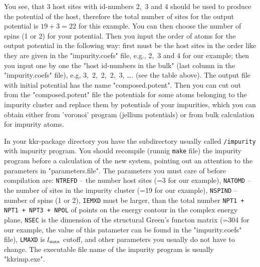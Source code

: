 You see, that 3 host sites with id-numbers 2,\ 3 and 4 should be used
to produce the potential of the host, therefore the total number
of sites for the output potential is $19+3 = 22$ for this example.
You can then choose the number of spins (1 or 2) for your potential.
Then you input the order of atoms for the output potential 
in the following way: first must be the host sites in the order like 
they are given in the "impurity.coefs" file, e.g., 2,\ 3 and 4 for our 
example; then you input one by one the "host id-numbers in the bulk" (last 
column in the "impurity.coefs" file), e.g, 3,\ 2,\  2,\ 2,\ 3, \dots.  
(see the table above). The output file with initial potential has the name
"composed.potent". Then you can cut out from the "composed.potent" file
the potentials for some atoms belonging to the impurity cluster
and replace them by potentials of your impurities, which you can 
obtain either from 'voronoi' program (jellium potentials) or from
bulk calculation for impurity atoms.

 In your kkr-package directory you have the subdirectory usually called
{\tt /impurity} with impurity program. You should recompile (runnig {\tt make} 
file) the impurity program before a calculation of the new system, 
pointing out an attention to the parameters in "parameters.file".
The parameters you must care of before compilation are: {\tt NTREFD} -- 
the number host sites (=3 for our example), {\tt NATOMD} -- the number
of sites in the impurity cluster (=19 for our example), {\tt NSPIND} -- number 
of spins (1 or 2), {\tt IEMXD} must be larger, than the total number
{\tt NPT1 + NPT1 + NPT3 + NPOL} of points on the energy contour in the complex 
energy plane, {\tt NSEC} is the dimension of the structural Green's functon 
matrix (=304 for our example, the value of this patameter can be found in 
the "impurity.coefs" file), {\tt LMAXD} is $l_{\rm max}$ cutoff, and other 
parameters you usually do not have to change. The executable file name 
of the impurity program is usually "kkrimp.exe".


